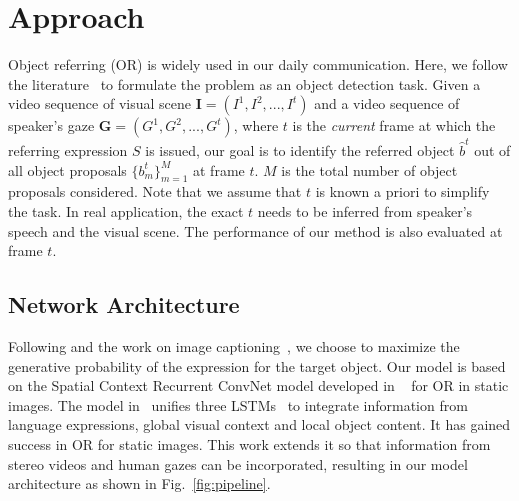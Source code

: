 \documentclass[10pt,twocolumn,letterpaper]{article}
\begin{document}
\section{Approach} 
\label{sec:approach}
Object referring (OR) is widely used in our daily communication. Here, we follow the literature~\cite{hu2016natural,mao2016generation} to formulate the problem as an object detection task. Given a video sequence of visual scene $\mathbf{I}=(I^1, I^2, ...,I^t)$ and a video sequence of speaker's gaze $\mathbf{G}=(G^1, G^2, ...,G^t)$, where $t$ is the \emph{current} frame at which the referring expression $S$ is issued, our goal is to identify the referred object $\hat{b}^t$ out of all object proposals $\{b_m^t\}_{m=1}^M$  at frame $t$. $M$ is the total number of object proposals considered. Note that we assume that $t$ is known a priori to simplify the task. In real application, the exact $t$ needs to be inferred from speaker's speech and the visual scene. The performance of our method is also evaluated at frame $t$. 



\subsection{Network Architecture} 
\label{sec:model}


Following \cite{hu2016natural} and the work on image captioning~\cite{densecap:cvpr16}, we choose to maximize the generative probability of the expression for the target object.   Our model is based on the Spatial Context Recurrent ConvNet  model developed in ~\cite{hu2016natural} for OR in static images. The model in~\cite{hu2016natural}  unifies three LSTMs~\cite{lstm} to integrate information from language expressions, global visual context and local object content. 
It has gained success in OR for static images. This work extends it so that information from stereo videos and human gazes can be incorporated, resulting in our model architecture as shown in Fig.~\ref{fig:pipeline}.
\end{document}
